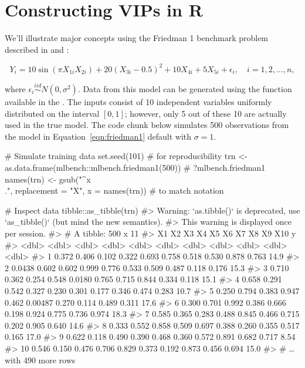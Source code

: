 \section{Constructing VIPs in R}

We'll illustrate major concepts using the Friedman 1 benchmark problem described in \citet{multivariate-friedman-1991} and \citet{bagging-breiman-1996}: 

\begin{equation}
  Y_i = 10 \sin\left(\pi X_{1i} X_{2i}\right) + 20 \left(X_{3i} - 0.5\right) ^ 2 + 10 X_{4i} + 5 X_{5i} + \epsilon_i, \quad i = 1, 2, \dots, n,
\label{eqn:friedman1}
\end{equation}

where $\epsilon_i \stackrel{iid}{\sim} N\left(0, \sigma^2\right)$. Data from this model can be generated using the  function available in the  \citep{mlbench-pkg}. The inputs consist of 10 independent variables uniformly distributed on the interval $\left[0,1\right]$; however, only 5 out of these 10 are actually used in the true model. The code chunk below simulates 500 observations from the model in Equation~\eqref{eqn:friedman1} default with $\sigma = 1$.

\begin{example}
# Simulate training data
set.seed(101)  # for reproducibility
trn <- as.data.frame(mlbench::mlbench.friedman1(500))  # ?mlbench.friedman1
names(trn) <- gsub("^x\\.", replacement = "X", x = names(trn))  # to match notation

# Inspect data
tibble::as_tibble(trn)
#> Warning: `as.tibble()` is deprecated, use `as_tibble()` (but mind the new semantics).
#> This warning is displayed once per session.
#> # A tibble: 500 x 11
#>        X1    X2    X3    X4     X5      X6    X7    X8    X9   X10     y
#>     <dbl> <dbl> <dbl> <dbl>  <dbl>   <dbl> <dbl> <dbl> <dbl> <dbl> <dbl>
#>  1 0.372  0.406 0.102 0.322 0.693  0.758   0.518 0.530 0.878 0.763 14.9 
#>  2 0.0438 0.602 0.602 0.999 0.776  0.533   0.509 0.487 0.118 0.176 15.3 
#>  3 0.710  0.362 0.254 0.548 0.0180 0.765   0.715 0.844 0.334 0.118 15.1 
#>  4 0.658  0.291 0.542 0.327 0.230  0.301   0.177 0.346 0.474 0.283 10.7 
#>  5 0.250  0.794 0.383 0.947 0.462  0.00487 0.270 0.114 0.489 0.311 17.6 
#>  6 0.300  0.701 0.992 0.386 0.666  0.198   0.924 0.775 0.736 0.974 18.3 
#>  7 0.585  0.365 0.283 0.488 0.845  0.466   0.715 0.202 0.905 0.640 14.6 
#>  8 0.333  0.552 0.858 0.509 0.697  0.388   0.260 0.355 0.517 0.165 17.0 
#>  9 0.622  0.118 0.490 0.390 0.468  0.360   0.572 0.891 0.682 0.717  8.54
#> 10 0.546  0.150 0.476 0.706 0.829  0.373   0.192 0.873 0.456 0.694 15.0 
#> # … with 490 more rows
\end{example}


